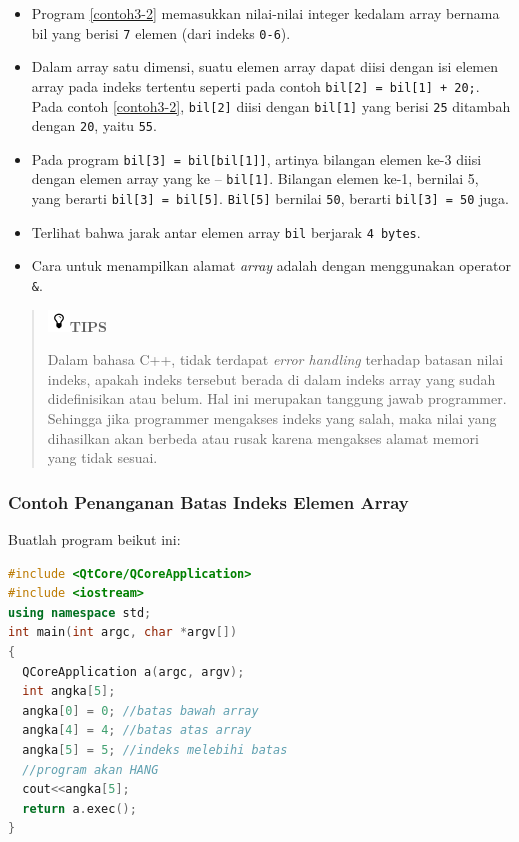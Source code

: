 \begin{itemize}

\item
  Program \ref{contoh3-2} memasukkan nilai-nilai integer kedalam array bernama
  bil yang berisi \texttt{7} elemen (dari indeks \texttt{0-6}).
\item
  Dalam array satu dimensi, suatu elemen array dapat diisi dengan isi
  elemen array pada indeks tertentu seperti pada contoh
  \texttt{bil{[}2{]}\ =\ bil{[}1{]}\ +\ 20;}. Pada contoh \ref{contoh3-2},
  \texttt{bil{[}2{]}} diisi dengan \texttt{bil{[}1{]}} yang berisi
  \texttt{25} ditambah dengan \texttt{20}, yaitu \texttt{55}.
\item
  Pada program \texttt{bil{[}3{]}\ =\ bil{[}bil{[}1{]}{]}}, artinya
  bilangan elemen ke-3 diisi dengan elemen array yang ke --
  \texttt{bil{[}1{]}}. Bilangan elemen ke-1, bernilai 5, yang berarti
  \texttt{bil{[}3{]}\ =\ bil{[}5{]}}. \texttt{Bil{[}5{]}} bernilai
  \texttt{50}, berarti \texttt{bil{[}3{]}\ =\ 50} juga.
\item
  Terlihat bahwa jarak antar elemen array \texttt{bil} berjarak
  \texttt{4\ bytes}.
\item
  Cara untuk menampilkan alamat \emph{array} adalah dengan menggunakan
  operator \texttt{\&}.
\end{itemize}
\begin{quotation}
\includegraphics{../manuscript/images/tips.png}\textbf{TIPS} 

Dalam
bahasa C++, tidak terdapat \emph{error handling} terhadap batasan nilai
indeks, apakah indeks tersebut berada di dalam indeks array yang sudah
didefinisikan atau belum. Hal ini merupakan tanggung jawab programmer.
Sehingga jika programmer mengakses indeks yang salah, maka nilai yang
dihasilkan akan berbeda atau rusak karena mengakses alamat memori yang
tidak sesuai.
\end{quotation}
 

\subsubsection*{Contoh  Penanganan Batas Indeks Elemen Array}

Buatlah program beikut ini:

\begin{lstlisting}[language=c++, caption=Penanganan Batas Indeks Elemen Array, label=contoh3-3]
#include <QtCore/QCoreApplication>
#include <iostream>
using namespace std;
int main(int argc, char *argv[])
{
  QCoreApplication a(argc, argv);
  int angka[5];
  angka[0] = 0; //batas bawah array
  angka[4] = 4; //batas atas array
  angka[5] = 5; //indeks melebihi batas
  //program akan HANG
  cout<<angka[5];
  return a.exec();
}
\end{lstlisting}

